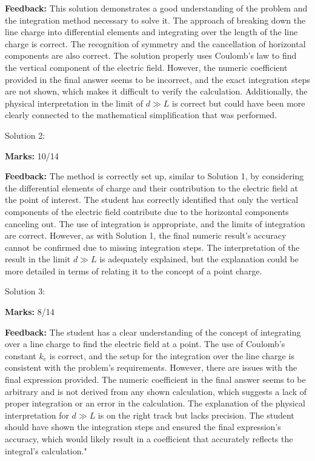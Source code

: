\documentclass[a4paper,11pt]{article}
\begin{document}
\textbf{Feedback:} This solution demonstrates a good understanding of the problem and the integration method necessary to solve it. The approach of breaking down the line charge into differential elements and integrating over the length of the line charge is correct. The recognition of symmetry and the cancellation of horizontal components are also correct. The solution properly uses Coulomb's law to find the vertical component of the electric field. However, the numeric coefficient provided in the final answer seems to be incorrect, and the exact integration steps are not shown, which makes it difficult to verify the calculation. Additionally, the physical interpretation in the limit of \( d \gg L \) is correct but could have been more clearly connected to the mathematical simplification that was performed.

Solution 2:

\textbf{Marks:} 10/14

\textbf{Feedback:} The method is correctly set up, similar to Solution 1, by considering the differential elements of charge and their contribution to the electric field at the point of interest. The student has correctly identified that only the vertical components of the electric field contribute due to the horizontal components canceling out. The use of integration is appropriate, and the limits of integration are correct. However, as with Solution 1, the final numeric result's accuracy cannot be confirmed due to missing integration steps. The interpretation of the result in the limit \( d \gg L \) is adequately explained, but the explanation could be more detailed in terms of relating it to the concept of a point charge.

Solution 3:

\textbf{Marks:} 8/14

\textbf{Feedback:} The student has a clear understanding of the concept of integrating over a line charge to find the electric field at a point. The use of Coulomb's constant \( k_e \) is correct, and the setup for the integration over the line charge is consistent with the problem's requirements. However, there are issues with the final expression provided. The numeric coefficient in the final answer seems to be arbitrary and is not derived from any shown calculation, which suggests a lack of proper integration or an error in the calculation. The explanation of the physical interpretation for \( d \gg L \) is on the right track but lacks precision. The student should have shown the integration steps and ensured the final expression's accuracy, which would likely result in a coefficient that accurately reflects the integral's calculation."
\end{document}
